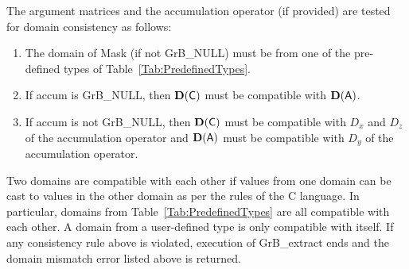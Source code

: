 The argument matrices and the accumulation 
operator (if provided) are tested for domain consistency as follows:
\begin{enumerate}
	\item The domain of {\sf Mask} (if not {\sf GrB\_NULL}) must be from one of 
    the pre-defined types of Table~\ref{Tab:PredefinedTypes}.

	\item If {\sf accum} is {\sf GrB\_NULL}, then $\bold{D}({\sf C})$ must be 
    compatible with $\bold{D}({\sf A})$.

	\item If {\sf accum} is not {\sf GrB\_NULL}, then $\bold{D}({\sf C})$ must be
    compatible with $D_x$ and $D_z$ of the accumulation operator and 
    $\bold{D}({\sf A})$ must be compatible with $D_y$ of the accumulation operator.
\end{enumerate}
Two domains are compatible with each other if values from one domain can be cast 
to values in the other domain as per the rules of the C language.
In particular, domains from Table~\ref{Tab:PredefinedTypes} are all compatible 
with each other. A domain from a user-defined type is only compatible with itself.
If any consistency rule above is violated, execution of {\sf GrB\_extract} ends
and the domain mismatch error listed above is returned.

